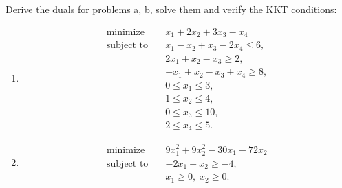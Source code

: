 \documentclass[11pt,letter,notitlepage]{article}
\theoremstyle{definition}
\begin{document}
\newpage
\begin{exercise}
Derive the duals for problems a, b, solve them and verify the KKT conditions:

\begin{enumerate}[label=(\alph*)]
    \item
    \[
    \begin{aligned}
    \text{minimize} \quad & x_1 + 2x_2 + 3x_3 - x_4 \\
    \text{subject to} \quad
    & x_1 - x_2 + x_3 - 2x_4 \le 6, \\
    & 2x_1 + x_2 - x_3 \ge 2, \\
    & -x_1 + x_2 - x_3 + x_4 \ge 8, \\
    & 0 \le x_1 \le 3, \\
    & 1 \le x_2 \le 4, \\
    & 0 \le x_3 \le 10, \\
    & 2 \le x_4 \le 5.
    \end{aligned}
    \]

    \item
    \[
    \begin{aligned}
    \text{minimize} \quad & 9x_1^2 + 9x_2^2 - 30x_1 - 72x_2 \\
    \text{subject to} \quad
    & -2x_1 - x_2 \ge -4, \\
    & x_1 \ge 0,\; x_2 \ge 0.
    \end{aligned}
    \]
\end{enumerate}
\end{exercise}

\newpage
\end{document}
